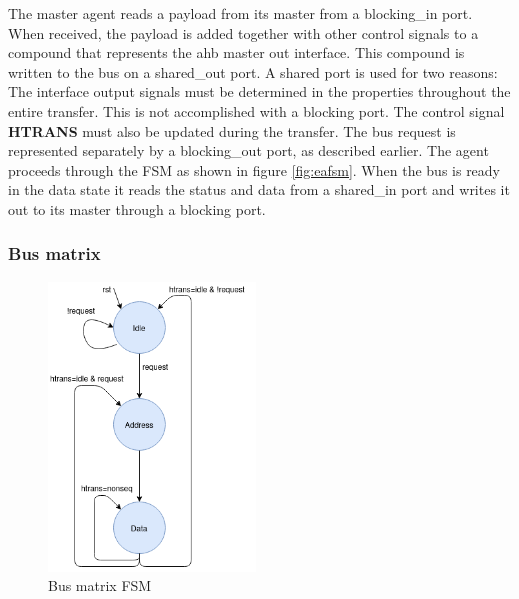 The master agent reads a payload from its master from a blocking\_in port. When received,  the payload is added together with other control signals to a compound that represents the ahb master out interface. This compound is written to the bus on a shared\_out port. A shared port is used for two reasons: The interface output signals must be determined in the properties throughout the entire transfer. This is not accomplished with a blocking port. The control signal \textbf{HTRANS} must also be updated during the transfer. The bus request is represented separately by a blocking\_out port, as described earlier. The agent proceeds through the FSM as shown in figure \ref{fig:eafsm}. When the bus is ready in the data state it reads the status and data from a shared\_in port and writes it out to its master through a blocking port.  

\subsubsection{Bus matrix}
\begin{figure}
\includegraphics[width=5.5cm]{figs/ESL/Bus_fsm_new.png}
\caption{Bus matrix FSM}\label{fig:busfsm}
\end{figure}

